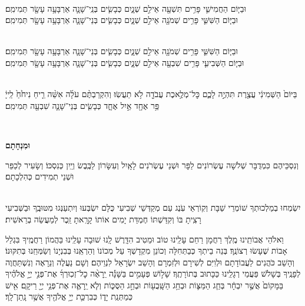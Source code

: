 \documentclass[twoside, openany, parskip=half, 11pt]{book}
\begin{document}
 \\
וּבַיּ֧וֹם  הַחֲמִישִׁ֛י פָּרִ֥ים תִּשְׁעָ֖ה אֵילִ֣ם שְׁנָ֑יִם כְּבָשִׂ֧ים בְּנֵֽי־שָׁנָ֛ה אַרְבָּעָ֥ה עָשָׂ֖ר תְּמִימִֽם׃
\\
וּבַיּ֧וֹם הַשִּׁשִּׁ֛י פָּרִ֥ים שְׁמֹנָ֖ה אֵילִ֣ם שְׁנָ֑יִם כְּבָשִׂ֧ים בְּנֵי־שָׁנָ֛ה אַרְבָּעָ֥ה עָשָׂ֖ר תְּמִימִֽם׃



 \\
וּבַיּ֧וֹם  הַשִּׁשִּׁ֛י פָּרִ֥ים שְׁמֹנָ֖ה אֵילִ֣ם שְׁנָ֑יִם כְּבָשִׂ֧ים בְּנֵי־שָׁנָ֛ה אַרְבָּעָ֥ה עָשָׂ֖ר תְּמִימִֽם׃
\\
וּבַיּ֧וֹם הַשְּׁבִיעִ֛י פָּרִ֥ים שִׁבְעָ֖ה אֵילִ֣ם שְׁנָ֑יִם כְּבָשִׂ֧ים בְּנֵי־שָׁנָ֛ה אַרְבָּעָ֥ה עָשָׂ֖ר תְּמִימִֽם׃

\\
בַּיּוֹם֙ הַשְּׁמִינִ֔י עֲצֶ֖רֶת תִּהְיֶ֣ה לָכֶ֑ם כׇּל־מְלֶ֥אכֶת עֲבֹדָ֖ה לֹ֥א תַעֲשֽׂוּ׃ וְהִקְרַבְתֶּ֨ם עֹלָ֜ה אִשֵּׁ֨ה רֵ֤יחַ נִיחֹ֙חַ֙ לַֽייָ֔ פַּ֥ר אֶחָ֖ד אַ֣יִל אֶחָ֑ד כְּבָשִׂ֧ים בְּנֵי־שָׁנָ֛ה שִׁבְעָ֖ה תְּמִימִֽם׃

\\ \label{uminchasam}
\begin{Large}\textbf{וּמִנְחָתָם}\end{Large}
וְנִסְכֵּיהֶם כִּמְדֻבָּר שְׁלֹשָׁה עֶשְׂרוֹנִים לַפָּר וּשְׁנֵי עֶשְׂרֹנִים לָאָֽיִל וְעִשָּׂרוֹן לַכֶּֽבֶשׂ וְיַֽיִן כְּנִסְכּוֹ׃ וְשָׂעִיר לְכַפֵּר וּשְׁנֵי תְמִידִים כְּהִלְכָתָם׃

\begin{sometimes}

\shabbos\\
יִשְׂמְחוּ בְמַלְכוּתְךָ שׁוֹמְרֵי שַׁבָּת וְקֽוֹרְאֵי עֹֽנֶג עַם מְקַדְּשֵׁי שְׁבִיעִי כֻּלָּם יִשְׂבְּעוּ וְיִתְעַנְּגוּ מִטּוּבֶֽךָ וּבַשְּׁבִיעִי רָצִֽיתָ בּוֹ וְקִדַּשְׁתּוֹ חֶמְדַּת יָמִים אוֹתוֹ קָרָֽאתָ זֵֽכֶר לְמַעֲשֵׂה בְרֵאשִׁית׃

\end{sometimes}

\enlargethispage{\baselineskip}
וֵאלֹהֵי אֲבוֹתֵֽינוּ מֶֽלֶךְ רַחֲמָן רַחֵם עָלֵֽינוּ טוֹב וּמֵטִיב הִדָּֽרֶשׁ לָֽנוּ שׁוּבָה עָלֵֽינוּ בַּהֲמוֹן רַחֲמֶֽיךָ בִּגְלַל אָבוֹת שֶׁעָשׂוּ רְצוֹנֶֽךָ׃ בְּנֵה בֵיתְךָ כְּבַתְּחִלָּה וְכוֹנֵן מִקְדָשְׁךָ עַל מְכוֹנוֹ וְהַרְאֵֽנוּ בְּבִנְיָנוֹ וְשַׂמְּחֵֽנוּ בְּתִקּוּנוֹ׃ וְהָשֵׁב כֹּהֲנִים לַעֲבוֹדָתָם וּלְוִיִּם לְשִׁירָם וּלְזִמְרָם וְהָשֵׁב יִשְׂרָאֵל לִנְוֵיהֶם׃ וְשָׁם נַעֲלֶה וְנֵרָאֶה וְנִשְׁתַּחֲוֶה לְפָנֶֽיךָ בְּשָׁלֹֹשׁ פַּעֲמֵי רְגָלֵֽינוּ כַּכָּתוּב בְּתוֹרָתֶֽךָ׃ שָׁל֣וֹשׁ פְּעָמִ֣ים בַּשָּׁנָ֡ה יֵֽרָאֶ֨ה כׇל־זְכֽוּרְךָ֜ אֶת־פְּנֵ֣י יְיָ֣ אֱלֹהֶ֗יךָ בַּמָּקוֹם֙ אֲשֶׁ֣ר יִבְחָ֔ר בְּחַ֧ג הַמַּצּ֛וֹת וּבְחַ֥ג הַשָּֽׁבֻע֖וֹת וּבְחַ֣ג הַסֻּכּ֑וֹת וְלֹ֧א יֵֽרָאֶ֛ה אֶת־פְּנֵ֥י יְיָ֖ רֵיקָֽם׃ אִ֖ישׁ כְּמַתְּנַֽת יָד֑וֹ כְּבִרְכַּ֛ת יְיָ֥ אֱלֹהֶ֖יךָ אֲשֶׁ֥ר נָֽתַן־לָֽךְ׃
\end{document}
